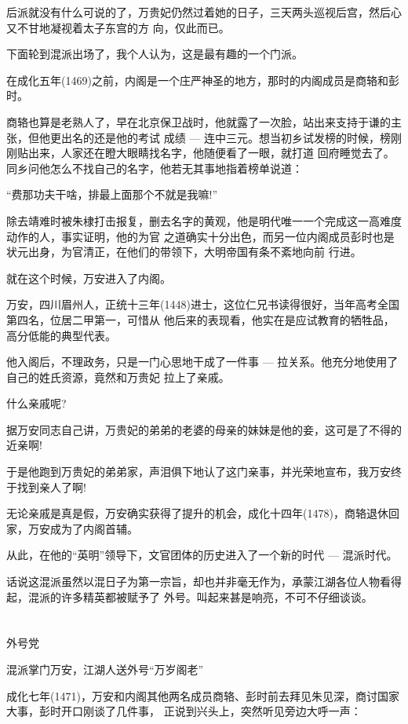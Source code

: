 \documentclass[11pt,a4paper,onecolumn]{article}
\begin{document}
后派就没有什么可说的了，万贵妃仍然过着她的日子，三天两头巡视后宫，然后心又不甘地凝视着太子东宫的方
向，仅此而已。

下面轮到混派出场了，我个人认为，这是最有趣的一个门派。

在成化五年(1469)之前，内阁是一个庄严神圣的地方，那时的内阁成员是商辂和彭时。

商辂也算是老熟人了，早在北京保卫战时，他就露了一次脸，站出来支持于谦的主张，但他更出名的还是他的考试
成绩 --- 连中三元。想当初乡试发榜的时候，榜刚刚贴出来，人家还在瞪大眼睛找名字，他随便看了一眼，就打道
回府睡觉去了。同乡问他怎么不找自己的名字，他若无其事地指着榜单说道：

``费那功夫干啥，排最上面那个不就是我嘛!''

除去靖难时被朱棣打击报复，删去名字的黄观，他是明代唯一一个完成这一高难度动作的人，事实证明，他的为官
之道确实十分出色，而另一位内阁成员彭时也是状元出身，为官清正，在他们的带领下，大明帝国有条不紊地向前
行进。

就在这个时候，万安进入了内阁。

万安，四川眉州人，正统十三年(1448)进士，这位仁兄书读得很好，当年高考全国第四名，位居二甲第一，可惜从
他后来的表现看，他实在是应试教育的牺牲品，高分低能的典型代表。

他入阁后，不理政务，只是一门心思地干成了一件事 --- 拉关系。他充分地使用了自己的姓氏资源，竟然和万贵妃
拉上了亲戚。

什么亲戚呢?

据万安同志自己讲，万贵妃的弟弟的老婆的母亲的妹妹是他的妾，这可是了不得的近亲啊!

于是他跑到万贵妃的弟弟家，声泪俱下地认了这门亲事，并光荣地宣布，我万安终于找到亲人了啊!

无论亲戚是真是假，万安确实获得了提升的机会，成化十四年(1478)，商辂退休回家，万安成为了内阁首辅。

从此，在他的``英明''领导下，文官团体的历史进入了一个新的时代 --- 混派时代。

话说这混派虽然以混日子为第一宗旨，却也并非毫无作为，承蒙江湖各位人物看得起，混派的许多精英都被赋予了
外号。叫起来甚是响亮，不可不仔细谈谈。

\section[\thesection]{}

外号党

混派掌门万安，江湖人送外号``万岁阁老''

成化七年(1471)，万安和内阁其他两名成员商辂、彭时前去拜见朱见深，商讨国家大事，彭时开口刚谈了几件事，
正说到兴头上，突然听见旁边大呼一声：
\end{document}
